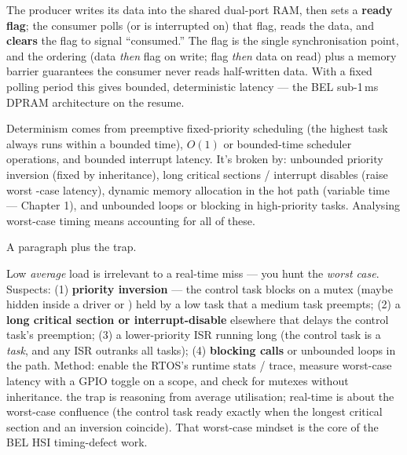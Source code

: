 The producer writes its data into the shared dual-port RAM, then sets a
\textbf{ready flag}; the consumer polls (or is interrupted on) that flag, reads
the data, and \textbf{clears} the flag to signal ``consumed.'' The flag is the
single synchronisation point, and the ordering (data \emph{then} flag on write;
flag \emph{then} data on read) plus a memory barrier guarantees the consumer
never reads half-written data. With a fixed polling period this gives bounded,
deterministic latency --- the BEL sub-1\,ms DPRAM architecture on the resume.

Determinism comes from preemptive fixed-priority scheduling (the highest task
always runs within a bounded time), $O(1)$ or bounded-time scheduler operations,
and bounded interrupt latency. It's broken by: unbounded priority inversion
(fixed by inheritance), long critical sections / interrupt disables (raise worst
-case latency), dynamic memory allocation in the hot path (variable time ---
Chapter 1), and unbounded loops or blocking in high-priority tasks. Analysing
worst-case timing means accounting for all of these.

%
{A paragraph plus the trap.}

Low \emph{average} load is irrelevant to a real-time miss --- you hunt the
\emph{worst case}. Suspects: (1) \textbf{priority inversion} --- the control
task blocks on a mutex (maybe hidden inside a driver or ) held by a
low task that a medium task preempts; (2) a \textbf{long critical section or
interrupt-disable} elsewhere that delays the control task's preemption; (3) a
lower-priority ISR running long (the control task is a \emph{task}, and any ISR
outranks all tasks); (4) \textbf{blocking calls} or unbounded loops in the
path. Method: enable the RTOS's runtime stats / trace, measure worst-case
latency with a GPIO toggle on a scope, and check for mutexes without
inheritance. \trap the trap is reasoning from average utilisation; real-time is
about the worst-case confluence (the control task ready exactly when the longest
critical section and an inversion coincide). That worst-case mindset is the core
of the BEL HSI timing-defect work.

